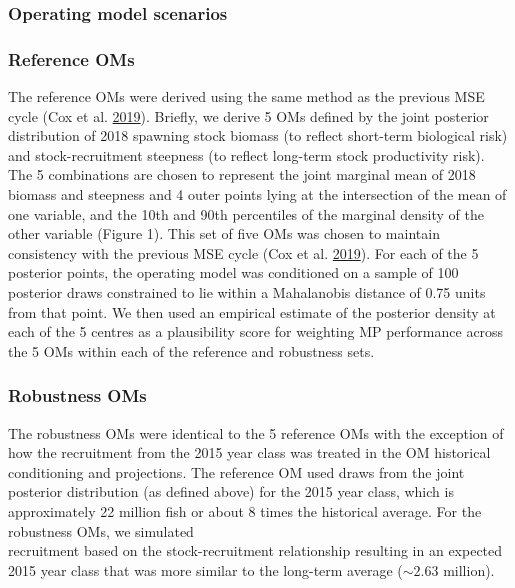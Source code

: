 \documentclass[11pt]{book}
\begin{document}
\hypertarget{operating-model-scenarios}{%
\subsubsection{Operating model scenarios}\label{operating-model-scenarios}}

\hypertarget{reference-oms}{%
\subsubsection{Reference OMs}\label{reference-oms}}

The reference OMs were derived using the same method as the previous MSE cycle (Cox et al. \protect\hyperlink{ref-cox2019evaluating}{2019}). Briefly, we derive 5 OMs defined by the joint posterior distribution of 2018 spawning stock biomass (to reflect short-term biological risk) and stock-recruitment steepness (to reflect long-term stock productivity risk). The 5 combinations are chosen to represent the joint marginal mean of 2018 biomass and steepness and 4 outer points lying at the intersection of the mean of one variable, and the 10th and 90th percentiles of the marginal density of the other variable (Figure 1). This set of five OMs was chosen to maintain consistency with the previous MSE cycle (Cox et al. \protect\hyperlink{ref-cox2019evaluating}{2019}). For each of the 5 posterior points, the operating model was conditioned on a sample of 100 posterior draws constrained to lie within a Mahalanobis distance of 0.75 units from that point. We then used an empirical estimate of the posterior density at each of the 5 centres as a plausibility score for weighting MP performance across the 5 OMs within each of the reference and robustness sets.

\hypertarget{robustness-oms}{%
\subsubsection{Robustness OMs}\label{robustness-oms}}

The robustness OMs were identical to the 5 reference OMs with the exception of how the recruitment from the 2015 year class was treated in the OM historical conditioning and projections. The reference OM used draws from the joint posterior distribution (as defined above) for the 2015 year class, which is approximately 22 million fish or about 8 times the historical average. For the robustness OMs, we simulated\\
recruitment based on the stock-recruitment relationship resulting in an expected 2015 year class that was more similar to the long-term average (\(\sim 2.63\) million).
\end{document}
